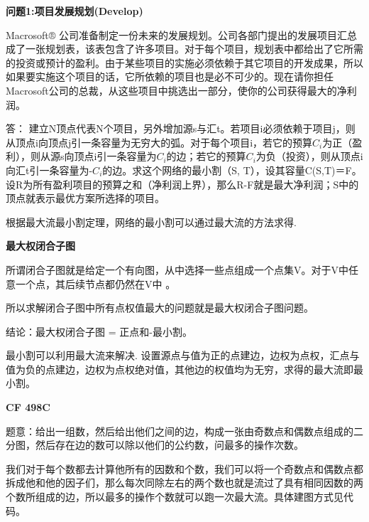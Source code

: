 {\bfseries 问题1:项目发展规划(Develop) }

Macrosoft® 公司准备制定一份未来的发展规划。公司各部门提出的发展项目汇总成了一张规划表，该表包含了许多项目。对于每个项目，规划表中都给出了它所需的投资或预计的盈利。由于某些项目的实施必须依赖于其它项目的开发成果，所以如果要实施这个项目的话，它所依赖的项目也是必不可少的。现在请你担任Macrosoft公司的总裁，从这些项目中挑选出一部分，使你的公司获得最大的净利润。

答： 建立N顶点代表N个项目，另外增加源s与汇t。若项目i必须依赖于项目j，则从顶点i向顶点j引一条容量为无穷大的弧。对于每个项目i，若它的预算$C_i$为正（盈利），则从源s向顶点i引一条容量为$C_i$的边；若它的预算$C_i$为负（投资），则从顶点i向汇t引一条容量为-$C_i$的边。求这个网络的最小割（S, T），设其容量C(S,T)＝F。设R为所有盈利项目的预算之和（净利润上界），那么R-F就是最大净利润；S中的顶点就表示最优方案所选择的项目。

根据最大流最小割定理，网络的最小割可以通过最大流的方法求得.

{\bfseries 最大权闭合子图}

所谓闭合子图就是给定一个有向图，从中选择一些点组成一个点集V。对于V中任意一个点，其后续节点都仍然在V中 。

所以求解闭合子图中所有点权值最大的问题就是最大权闭合子图问题。

结论：最大权闭合子图 = 正点和-最小割。 

最小割可以利用最大流来解决. 设置源点与值为正的点建边，边权为点权，汇点与值为负的点建边，边权为点权绝对值，其他边的权值均为无穷，求得的最大流即最小割。

{\bfseries CF 498C}

题意：给出一组数，然后给出他们之间的边，构成一张由奇数点和偶数点组成的二分图，然后存在边的数可以除以他们的公约数，问最多的操作次数。

我们对于每个数都去计算他所有的因数和个数，我们可以将一个奇数点和偶数点都拆成他和他的因子们，那么每次同除左右的两个数也就是流过了具有相同因数的两个数所组成的边，所以最多的操作个数就可以跑一次最大流。具体建图方式见代码。

